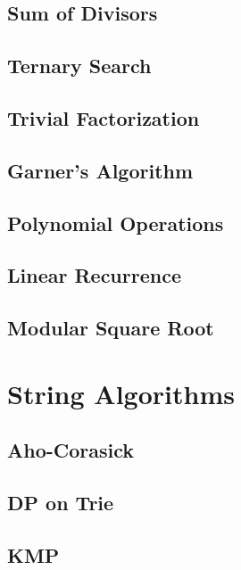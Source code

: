 \documentclass[10pt,letterpaper,landscape,twocolumn]{article}
\begin{document}
\subsection{Sum of Divisors}

\subsection{Ternary Search}

\subsection{Trivial Factorization}


\subsection{Garner's Algorithm}

\subsection{Polynomial Operations}

\subsection{Linear Recurrence}

\subsection{Modular Square Root}


\section{String Algorithms}
\subsection{Aho-Corasick}

\subsection{DP on Trie}

\subsection{KMP}

\end{document}
